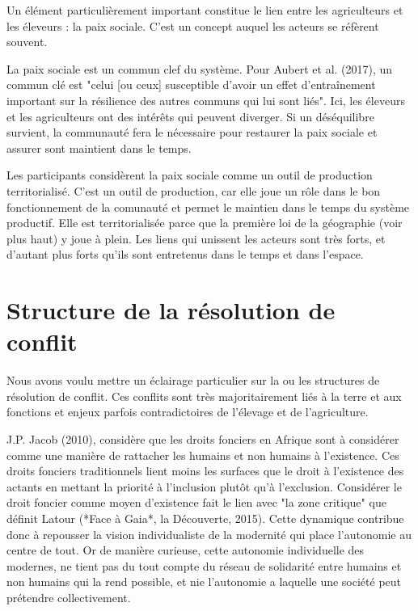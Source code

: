 Un élément particulièrement important constitue le lien entre les agriculteurs et les éleveurs : la paix sociale. C'est un concept auquel les acteurs se réfèrent souvent.

La paix sociale est un commun clef du système. Pour Aubert et al. (2017), un commun clé est "celui [ou ceux] susceptible d’avoir un effet d’entraînement important sur la résilience des autres communs qui lui sont liés". Ici, les éleveurs et les agriculteurs ont des intérêts qui peuvent diverger. Si un déséquilibre survient, la communauté fera le nécessaire pour restaurer la paix sociale et assurer sont maintient dans le temps.

Les participants considèrent la paix sociale comme un outil de production territorialisé. C'est un outil de production, car elle joue un rôle dans le bon fonctionnement de la comunauté et permet le maintien dans le temps du système productif. Elle est territorialisée parce que la première loi de la géographie (voir plus haut) y joue à plein. Les liens qui unissent les acteurs sont très forts, et d'autant plus forts qu'ils sont entretenus dans le temps et dans l'espace. 

\section{Structure de la résolution de conflit}

Nous avons voulu mettre un éclairage particulier sur la ou les structures de résolution de conflit. Ces conflits sont très majoritairement liés à la terre et aux fonctions et enjeux parfois contradictoires de l'élevage et de l'agriculture. 

J.P. Jacob (2010), considère que les droits fonciers en Afrique sont à considérer comme une manière de rattacher les humains et non humains à l'existence. Ces droits fonciers traditionnels lient moins les surfaces que le droit à l'existence des actants en mettant la priorité à l'inclusion plutôt qu'à l'exclusion. Considérer le droit foncier comme moyen d'existence fait le lien avec "la zone critique" que définit Latour (*Face à Gaia*, la Découverte, 2015). Cette dynamique contribue donc à repousser la vision individualiste de la modernité qui place l'autonomie au centre de tout. Or de manière curieuse, cette autonomie individuelle des modernes, ne tient pas du tout compte du réseau de solidarité entre humains et non humains qui la rend possible, et nie l'autonomie a laquelle une société peut prétendre collectivement. 

